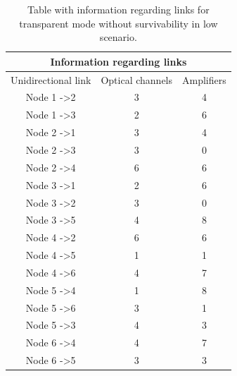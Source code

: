 \begin{table}[H]
	\centering
	\begin{tabular}{|c|c|c|}
		\hline
		\multicolumn{3}{|c|}{\textbf{Information regarding links}} \\ \hline
		Unidirectional link & Optical channels & Amplifiers \\ \hline
		Node 1 -\textgreater 2 & 3 & 4 \\ \hline
		Node 1 -\textgreater 3 & 2 & 6 \\ \hline
		Node 2 -\textgreater 1 & 3 & 4 \\ \hline
		Node 2 -\textgreater 3 & 3 & 0 \\ \hline
		Node 2 -\textgreater 4 & 6 & 6 \\ \hline
		Node 3 -\textgreater 1 & 2 & 6 \\ \hline
		Node 3 -\textgreater 2 & 3 & 0 \\ \hline
		Node 3 -\textgreater 5 & 4 & 8 \\ \hline
		Node 4 -\textgreater 2 & 6 & 6 \\ \hline
		Node 4 -\textgreater 5 & 1 & 1 \\ \hline
		Node 4 -\textgreater 6 & 4 & 7 \\ \hline
		Node 5 -\textgreater 4 & 1 & 8 \\ \hline
		Node 5 -\textgreater 6 & 3 & 1 \\ \hline
		Node 5 -\textgreater 3 & 4 & 3 \\ \hline
		Node 6 -\textgreater 4 & 4 & 7 \\ \hline
		Node 6 -\textgreater 5 & 3 & 3 \\ \hline
	\end{tabular}
	\caption{Table with information regarding links for transparent mode without survivability in low
		scenario.}
\end{table}

